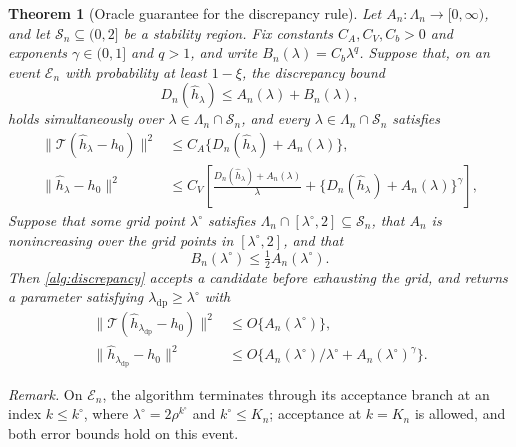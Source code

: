 \documentclass[12pt]{article}
\theoremstyle{plain}
\newtheorem{theorem}{Theorem}[section]
\theoremstyle{definition}
\theoremstyle{remark}
\begin{document}
\begin{theorem}[Oracle guarantee for the discrepancy rule]\label{thm:common_dp}
Let $A_n:\Lambda_n\to[0,\infty)$, and let $\mathcal S_n\subseteq(0,2]$ be a stability region. Fix constants $C_A,C_V,C_b>0$ and exponents $\gamma\in(0,1]$ and $q>1$, and write $B_n(\lambda)=C_b\lambda^q$. Suppose that, on an event $\mathcal E_n$ with probability at least $1-\xi$, the discrepancy bound
\begin{equation}\label{eq:common_discrepancy_bound}
D_n(\hat h_\lambda)\leqslant A_n(\lambda)+B_n(\lambda),
\end{equation}
  holds simultaneously over $\lambda\in\Lambda_n\cap\mathcal S_n$, and every $\lambda\in\Lambda_n\cap\mathcal S_n$ satisfies
\begin{equation}\label{eq:common_accepted_bounds}
\begin{aligned}
\|\mathcal T(\hat h_\lambda-h_0)\|^2
&\leqslant C_A\{D_n(\hat h_\lambda)+A_n(\lambda)\},\\
\|\hat h_\lambda-h_0\|^2
&\leqslant C_V\left[\frac{D_n(\hat h_\lambda)+A_n(\lambda)}{\lambda}+\{D_n(\hat h_\lambda)+A_n(\lambda)\}^\gamma\right],
\end{aligned}
\end{equation}
Suppose that some grid point $\lambda^\circ$ satisfies $\Lambda_n\cap[\lambda^\circ,2]\subseteq\mathcal S_n$, that $A_n$ is nonincreasing over the grid points in $[\lambda^\circ,2]$, and that
\begin{equation}\label{eq:common_oracle_crossing}
B_n(\lambda^\circ)\leqslant\tfrac12A_n(\lambda^\circ).
\end{equation}
Then \cref{alg:discrepancy} accepts a candidate before exhausting the grid, and returns a parameter satisfying $\lambda_{\mathrm{dp}}\geqslant\lambda^\circ$ with
\begin{align}\label{eq:common_rate}
\|\mathcal T(\hat h_{\lambda_{\mathrm{dp}}}-h_0)\|^2
&\leqslant O\{A_n(\lambda^\circ)\},\\
\|\hat h_{\lambda_{\mathrm{dp}}}-h_0\|^2
&\leqslant O\{A_n(\lambda^\circ)/\lambda^\circ+A_n(\lambda^\circ)^\gamma\}.
\end{align}
\end{theorem}

\noindent\textit{Remark.} On $\mathcal E_n$, the algorithm terminates through its acceptance branch at an index $k\leqslant k^\circ$, where $\lambda^\circ=2\rho^{k^\circ}$ and $k^\circ\leqslant K_n$; acceptance at $k=K_n$ is allowed, and both error bounds hold on this event.
\end{document}
